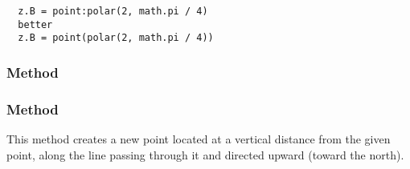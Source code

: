 \begin{mybox}
\begin{verbatim}
  z.B = point:polar(2, math.pi / 4)
  better 
  z.B = point(polar(2, math.pi / 4))
\end{verbatim}
\end{mybox}

\begin{tkzexample}[latex = 7cm]
\begin{center}
\end{center}

\end{tkzexample}


\subsubsection{Method } %
\label{ssub:method_point_polar_deg}


\begin{tkzexample}[latex=7cm]
\begin{center}
\end{center}
\end{tkzexample}


\subsubsection{Method } %
\label{ssub:example_method_point_north_d}

This method creates a new point located at a vertical distance from the given point, along the line passing through it and directed upward (toward the north).

